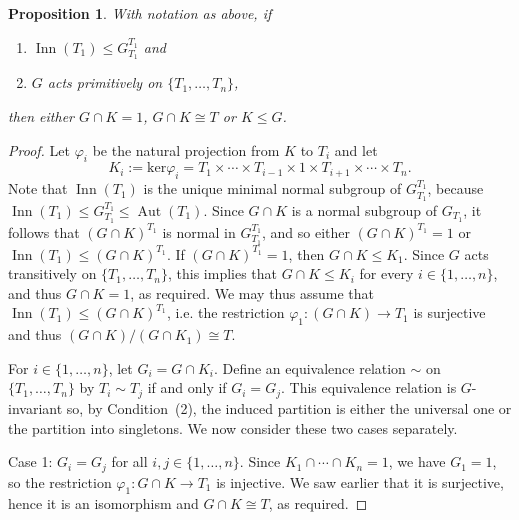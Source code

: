 \documentclass[11pt,a4paper]{amsart}
\newtheorem{proposition}[theorem]{Proposition}
\theoremstyle{definition}
\DeclareMathOperator{\Inn}{Inn}
\DeclareMathOperator{\Aut}{Aut}
\begin{document}
\begin{proposition}\label{WreathProducts}
With notation as above, if
\begin{enumerate}
\item $\Inn(T_1)\leq G_{T_1}^{T_1}$ and 
\item $G$ acts primitively on $\{T_1,\ldots,T_n\}$,
\end{enumerate}
then either $G\cap K=1$, $G\cap K\cong T$ or $K\leq G$.
\end{proposition}
\begin{proof}
Let $\varphi_i$ be the natural projection from $K$ to $T_i$ and let 
$$K_i := \mathrm{ker}\varphi_i=T_1\times\cdots \times T_{i-1}\times 1 \times T_{i+1}\times\cdots\times T_n.$$ 
Note that $\Inn(T_1)$ is the unique minimal normal subgroup of $G_{T_1}^{T_1}$, because $\Inn(T_1)\leq G_{T_1}^{T_1}\leq \Aut(T_1)$. Since $G\cap K$ is a normal subgroup of $G_{T_1}$, it follows that $(G\cap K)^{T_1}$ is normal in $G_{T_1}^{T_1}$, and so either $(G\cap K)^{T_1}=1$ or $\Inn(T_1)\leq (G\cap K)^{T_1}$. If $(G\cap K)^{T_1}=1$, then $G\cap K\leq K_1$. Since $G$ acts transitively on $\{T_1,\ldots,T_n\}$, this implies that $G\cap K\leq K_i$ for every $i\in\{1,\ldots,n\}$, and thus $G\cap K=1$, as required. We may thus assume that $\Inn(T_1)\leq (G\cap K)^{T_1}$, i.e. the restriction $\varphi_1:(G\cap K)\to T_1$ is surjective and thus $(G\cap K)/(G\cap K_1)\cong T$. 

For $i\in\{1,\ldots,n\}$, let $G_i=G\cap K_i$. Define an equivalence relation $\sim$ on $\{T_1,\ldots,T_n\}$ by $T_i \sim T_j$ if and only if $G_i = G_j$.  This equivalence relation is $G$-invariant so, by Condition~(2), the induced partition is either the universal one or the partition into singletons. We now consider these two cases separately.

Case 1: $G_i = G_j$ for all $i,j\in \{1,\ldots,n\}$. Since $K_1\cap\cdots \cap K_n=1$, we have $G_1=1$, so the restriction $\varphi_1:G\cap K\to T_1$ is injective. We saw earlier that it is surjective, hence it is an isomorphism and $G\cap K\cong T$, as required.


\end{proof}
\end{document}
